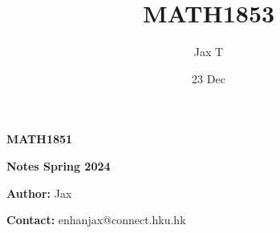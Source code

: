 \documentclass{article}
\title{MATH1853}
\author{Jax T}
\date{23 Dec}
\begin{document}
\begin{titlepage}
    \null\vfill %
    
    \centering
    \Huge\textbf{MATH1851}
    
    \vspace{0.1cm}
    \Large\textbf{Notes Spring 2024}
    
    \vspace{1cm}
    \normalsize\textbf{Author:} Jax
    
    \normalsize\textbf{Contact:} enhanjax@connect.hku.hk
    \vfill %
\end{titlepage}

\end{document}
